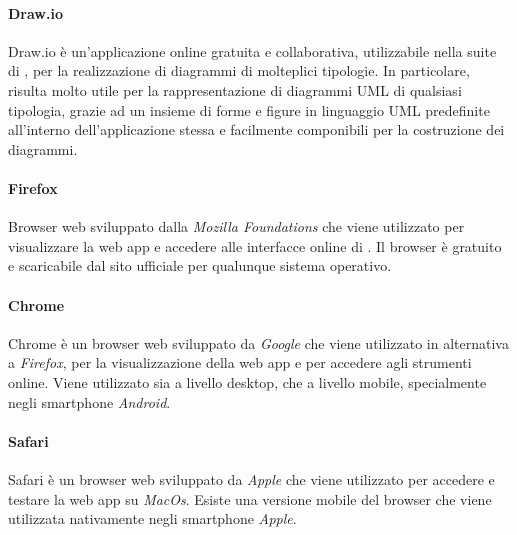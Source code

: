 				\paragraph{Draw.io} 
					Draw.io è un'applicazione online gratuita e collaborativa, utilizzabile nella suite di , per la realizzazione di diagrammi di molteplici tipologie. 
					\newline
					In particolare, risulta molto utile per la rappresentazione di diagrammi UML di qualsiasi tipologia, grazie ad un insieme di forme e figure in linguaggio UML predefinite all'interno dell'applicazione stessa e facilmente componibili per la costruzione dei diagrammi.
				
				\paragraph{Firefox} 
					Browser web sviluppato dalla \textit{Mozilla Foundations} che viene utilizzato per visualizzare la web app e accedere alle interfacce online di .
					\newline
					Il browser è gratuito e scaricabile dal sito ufficiale per qualunque sistema operativo.

				\paragraph{Chrome} 
					Chrome è un browser web sviluppato da \textit{Google} che viene utilizzato in alternativa a \textit{Firefox}, per la visualizzazione della web app e per accedere agli strumenti online.
					\newline
					Viene utilizzato sia a livello desktop, che a livello mobile, specialmente negli smartphone \textit{Android}.

				\paragraph{Safari} 
					Safari è un browser web sviluppato da \textit{Apple} che viene utilizzato per accedere e testare la web app su \textit{MacOs}.
					\newline
					Esiste una versione mobile del browser che viene utilizzata nativamente negli smartphone \textit{Apple}.